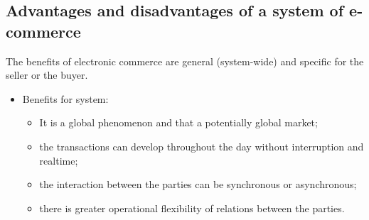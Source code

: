 \subsection{Advantages and disadvantages of a system of e-commerce}
The benefits of electronic commerce are general (system-wide) and specific for the seller or the buyer.
\begin{itemize}
  \item Benefits for system:
  \begin{itemize}
    \item It is a global phenomenon and that a potentially global market;
    \item the transactions can develop throughout the day without interruption and realtime;
    \item the interaction between the parties can be synchronous or asynchronous;
    \item there is greater operational flexibility of relations between the parties.
  \end{itemize}


\end{itemize}
